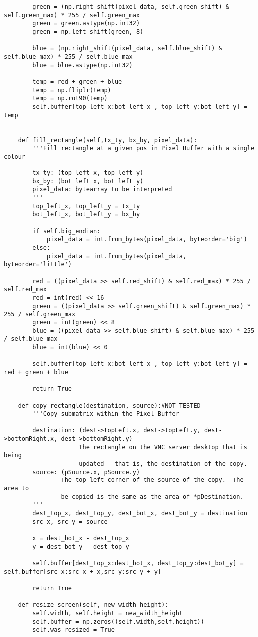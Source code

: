 \begin{lstlisting}
        green = (np.right_shift(pixel_data, self.green_shift) & self.green_max) * 255 / self.green_max
        green = green.astype(np.int32)
        green = np.left_shift(green, 8) 

        blue = (np.right_shift(pixel_data, self.blue_shift) & self.blue_max) * 255 / self.blue_max
        blue = blue.astype(np.int32)

        temp = red + green + blue
        temp = np.fliplr(temp)
        temp = np.rot90(temp)
        self.buffer[top_left_x:bot_left_x , top_left_y:bot_left_y] = temp
        
        
    def fill_rectangle(self,tx_ty, bx_by, pixel_data): 
        '''Fill rectangle at a given pos in Pixel Buffer with a single colour

        tx_ty: (top left x, top left y)
        bx_by: (bot left x, bot left y)
        pixel_data: bytearray to be interpreted 
        '''
        top_left_x, top_left_y = tx_ty
        bot_left_x, bot_left_y = bx_by
        
        if self.big_endian:
            pixel_data = int.from_bytes(pixel_data, byteorder='big')
        else:
            pixel_data = int.from_bytes(pixel_data, byteorder='little')
        
        red = ((pixel_data >> self.red_shift) & self.red_max) * 255 / self.red_max        
        red = int(red) << 16
        green = ((pixel_data >> self.green_shift) & self.green_max) * 255 / self.green_max
        green = int(green) << 8
        blue = ((pixel_data >> self.blue_shift) & self.blue_max) * 255 / self.blue_max
        blue = int(blue) << 0

        self.buffer[top_left_x:bot_left_x , top_left_y:bot_left_y] = red + green + blue

        return True

    def copy_rectangle(destination, source):#NOT TESTED
        '''Copy submatrix within the Pixel Buffer

        destination: (dest->topLeft.x, dest->topLeft.y, dest->bottomRight.x, dest->bottomRight.y)
                     The rectangle on the VNC server desktop that is being
                     updated - that is, the destination of the copy.
        source: (pSource.x, pSource.y)
                The top-left corner of the source of the copy.  The area to
                be copied is the same as the area of *pDestination.
        '''
        dest_top_x, dest_top_y, dest_bot_x, dest_bot_y = destination
        src_x, src_y = source

        x = dest_bot_x - dest_top_x
        y = dest_bot_y - dest_top_y

        self.buffer[dest_top_x:dest_bot_x, dest_top_y:dest_bot_y] = self.buffer[src_x:src_x + x,src_y:src_y + y] 
        
        return True

    def resize_screen(self, new_width_height):        
        self.width, self.height = new_width_height
        self.buffer = np.zeros((self.width,self.height))
        self.was_resized = True
\end{lstlisting}

